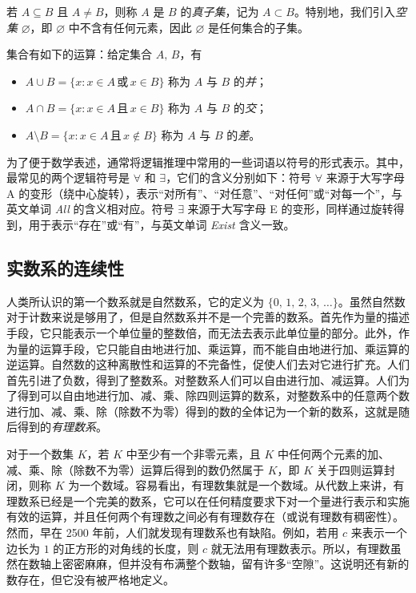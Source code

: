 \documentclass[UTF8,12pt,a4paper,fontset=fandol]{ctexbook}
\begin{document}
若 $A\subseteq B$ 且 $A\ne B$，则称 $A$ 是 $B$ 的\emph{真子集}，记为 $A\subset B$。特别地，我们引入\emph{空集} $\varnothing$，即 $\varnothing$ 中不含有任何元素，因此 $\varnothing$ 是任何集合的子集。


集合有如下的运算：给定集合 $A,\, B$，有
\begin{itemize}
  \item $A\cup B=\{x:x\in A \,\text{或}\, x\in B\}$ 称为 $A$ 与 $B$ 的\emph{并}；
  \item $A\cap B=\{x:x\in A\,\text{且}\,x\in B\}$ 称为 $A$ 与 $B$ 的\emph{交}；
  \item $A\setminus B=\{x:x\in A\,\text{且}\,x\notin B\}$ 称为 $A$ 与 $B$ 的\emph{差}。
\end{itemize}


为了便于数学表述，通常将逻辑推理中常用的一些词语以符号的形式表示。其中，最常见的两个逻辑符号是 \emph{$\forall$} 和 \emph{$\exists$}，它们的含义分别如下：符号 $\forall$ 来源于大写字母 A 的变形（绕中心旋转），表示“对所有”、“对任意”、“对任何”或“对每一个”，与英文单词 \emph{All} 的含义相对应。符号 $\exists$ 来源于大写字母 E 的变形，同样通过旋转得到，用于表示“存在”或“有”，与英文单词 \emph{Exist} 含义一致。


\subsection{实数系的连续性}
人类所认识的第一个数系就是自然数系，它的定义为 $\{0,\,1,\,2,\,3,\,\dots\}$。虽然自然数对于计数来说是够用了，但是自然数系并不是一个完善的数系。首先作为量的描述手段，它只能表示一个单位量的整数倍，而无法去表示此单位量的部分。此外，作为量的运算手段，它只能自由地进行加、乘运算，而不能自由地进行加、乘运算的逆运算。自然数的这种离散性和运算的不完备性，促使人们去对它进行扩充。人们首先引进了负数，得到了整数系。对整数系人们可以自由进行加、减运算。人们为了得到可以自由地进行加、减、乘、除四则运算的数系，对整数系中的任意两个数进行加、减、乘、除（除数不为零）得到的数的全体记为一个新的数系，这就是随后得到的\emph{有理数系}。


对于一个数集 $K$，若 $K$ 中至少有一个非零元素，且 $K$ 中任何两个元素的加、减、乘、除（除数不为零）运算后得到的数仍然属于 $K$，即 $K$ 关于四则运算封闭，则称 $K$ 为一个数域。容易看出，有理数集就是一个数域。从代数上来讲，有理数系已经是一个完美的数系，它可以在任何精度要求下对一个量进行表示和实施有效的运算，并且任何两个有理数之间必有有理数存在（或说有理数有稠密性）。然而，早在 2500 年前，人们就发现有理数系也有缺陷。例如，若用 $c$ 来表示一个边长为 $1$ 的正方形的对角线的长度，则 $c$ 就无法用有理数表示。所以，有理数虽然在数轴上密密麻麻，但并没有布满整个数轴，留有许多“空隙”。这说明还有新的数存在，但它没有被严格地定义。
\end{document}
